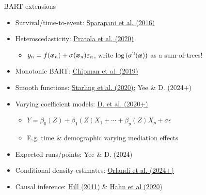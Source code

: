 \documentclass[aspectratio=199]{beamer}
\begin{document}
\begin{frame}{BART extensions}

\begin{itemize}
\item{Survival/time-to-event: \href{https://onlinelibrary.wiley.com/doi/abs/10.1002/sim.6893}{Sparapani et al. (2016)}}
\item{Heteroscedasticity: \href{https://www.tandfonline.com/doi/abs/10.1080/10618600.2019.1677243?journalCode=ucgs20}{Pratola et al. (2020)}}
\begin{itemize}
\item{$y_{n} = f(\bm{x}_{n}) + \sigma(\bm{x}_{n})\varepsilon_{n}$, write $\log{(\sigma^{2}(\bm{x}))}$ as a sum-of-trees! }
\end{itemize}
\item{Monotonic BART: \href{https://arxiv.org/abs/1612.01619}{Chipman et al. (2019)}}
\item{Smooth functions: \href{https://projecteuclid.org/journals/annals-of-applied-statistics/volume-14/issue-1/BART-with-targeted-smoothing--An-analysis-of-patient-specific/10.1214/19-AOAS1268.short}{Starling et al. (2020)}; Yee \& D. (2024+)}
\item{Varying coefficient models: \href{https://arxiv.org/abs/2003.06416}{D. et al. (2020+)}}
\begin{itemize}
\item{$Y = \beta_{0}(Z) + \beta_{1}(Z)X_{1} + \cdots + \beta_{p}(Z)X_{p} + \sigma\epsilon$}
\item{E.g. time \& demographic varying mediation effects}
\end{itemize}
\item{Expected runs/points: Yee \& D. (2024)}
\item{Conditional density estimates: \href{https://arxiv.org/abs/2112.12259}{Orlandi et al. (2024+)}}
\item{Causal inference: \href{https://www.tandfonline.com/doi/abs/10.1198/jcgs.2010.08162}{Hill (2011)} \& \href{https://projecteuclid.org/journals/bayesian-analysis/volume-15/issue-3/Bayesian-Regression-Tree-Models-for-Causal-Inference--Regularization-Confounding/10.1214/19-BA1195.full}{Hahn et al (2020)}}
\end{itemize}

\end{frame}
\end{document}
